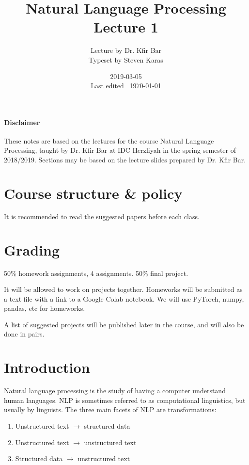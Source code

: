 \documentclass{idc_msc}
\title{Natural Language Processing \\\large Lecture 1}
\date{2019-03-05 \\ Last edited \currenttime\ \today}
\author{Lecture by Dr. Kfir Bar\\Typeset by Steven Karas}
\begin{document}
\paragraph{Disclaimer}

These notes are based on the lectures for the course Natural Language Processing, taught by Dr. Kfir Bar at IDC Herzliyah in the spring semester of 2018/2019.
Sections may be based on the lecture slides prepared by Dr. Kfir Bar.

\nocite{Jurafsky:2009:SLP:0131873210}
\nocite{manning1999foundations}
\nocite{DBLP:journals/corr/Goldberg15c}


\section{Course structure \& policy}

It is recommended to read the suggested papers before each class.


\section{Grading}

50\% homework assignments, 4 assignments.
50\% final project.

It will be allowed to work on projects together.
Homeworks will be submitted as a text file with a link to a Google Colab notebook.
We will use PyTorch, numpy, pandas, etc for homeworks.

A list of suggested projects will be published later in the course, and will also be done in pairs.

\section{Introduction}

Natural language processing is the study of having a computer understand human languages.
NLP is sometimes referred to as computational linguistics, but usually by linguists.
The three main facets of NLP are transformations:

\begin{enumerate}
  \item Unstructured text \(\to\) structured data
  \item Unstructured text \(\to\) unstructured text
  \item Structured data \(\to\) unstructured text
\end{enumerate}
\end{document}
